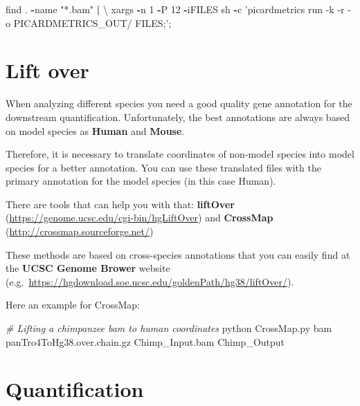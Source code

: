 \documentclass[]{book}
\newenvironment{Shaded}{\begin{snugshade}}{\end{snugshade}}
\newcommand{\CommentTok}[1]{\textcolor[rgb]{0.56,0.35,0.01}{\textit{#1}}}
\newcommand{\DecValTok}[1]{\textcolor[rgb]{0.00,0.00,0.81}{#1}}
\newcommand{\NormalTok}[1]{#1}
\newcommand{\OperatorTok}[1]{\textcolor[rgb]{0.81,0.36,0.00}{\textbf{#1}}}
\newcommand{\StringTok}[1]{\textcolor[rgb]{0.31,0.60,0.02}{#1}}
\begin{document}
\begin{Shaded}
\begin{Highlighting}[]
\NormalTok{find . }\OperatorTok{-}\NormalTok{name }\StringTok{"*.bam"} \OperatorTok{|}\StringTok{ }\NormalTok{\textbackslash{}}
\NormalTok{  xargs }\OperatorTok{-}\NormalTok{n }\DecValTok{1} \OperatorTok{-}\NormalTok{P }\DecValTok{12} \OperatorTok{-}\NormalTok{iFILES sh }\OperatorTok{-}\NormalTok{c }\StringTok{'picardmetrics run -k -r -o PICARDMETRICS_OUT/ FILES;'}\NormalTok{; }
\end{Highlighting}
\end{Shaded}

\hypertarget{lift-over}{%
\section{Lift over}\label{lift-over}}

When analyzing different species you need a good quality gene annotation for the downstream quantification. Unfortunately, the best annotations are always based on model species as \textbf{Human} and \textbf{Mouse}.

Therefore, it is necessary to translate coordinates of non-model species into model species for a better annotation. You can use these translated files with the primary annotation for the model species (in this case Human).

There are tools that can help you with that: \textbf{liftOver} (\url{https://genome.ucsc.edu/cgi-bin/hgLiftOver}) and \textbf{CrossMap} (\url{http://crossmap.sourceforge.net/})

These methods are based on cross-species annotations that you can easily find at the \textbf{UCSC Genome Brower} website (e.g.~\url{https://hgdownload.soe.ucsc.edu/goldenPath/hg38/liftOver/}).

Here an example for CrossMap:

\begin{Shaded}
\begin{Highlighting}[]
\CommentTok{# Lifting a chimpanzee bam to human coordinates}
\NormalTok{python CrossMap.py bam panTro4ToHg38.over.chain.gz Chimp_Input.bam Chimp_Output}
\end{Highlighting}
\end{Shaded}

\hypertarget{quantification}{%
\section{Quantification}\label{quantification}}
\end{document}
